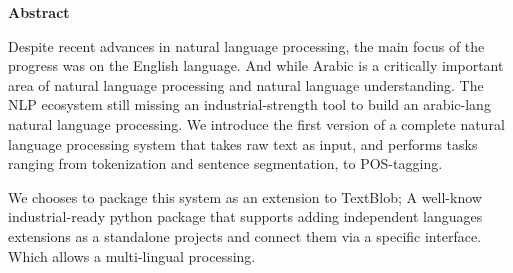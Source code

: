\thispagestyle{plain}
\begin{center}
    \vspace{0.9cm}
    \textbf{Abstract}
\end{center}

Despite recent advances in natural language processing, the main focus of the progress was on the English language. And while Arabic is a critically important area of natural language processing and natural language understanding. The NLP ecosystem still missing an industrial-strength tool to build an arabic-lang natural language processing. We introduce the first version of a complete natural language processing system that takes raw text as input, and performs tasks ranging from tokenization and sentence segmentation, to POS-tagging.

We chooses to package this system as an extension to TextBlob; A well-know industrial-ready python package that supports adding independent languages extensions as a standalone projects and connect  them via a specific interface. Which allows a multi-lingual processing.